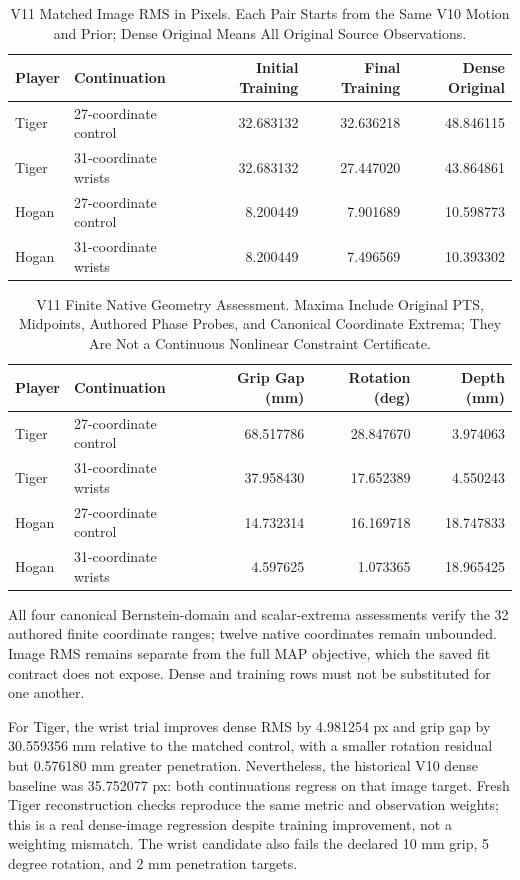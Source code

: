 \documentclass[11pt,letterpaper]{article}
\begin{document}
\begin{table}[ht]\centering\small
\begin{tabular}{@{}llrrr@{}}
\toprule Player & Continuation & Initial Training & Final Training & Dense Original\\\midrule
Tiger & 27-coordinate control & 32.683132 & 32.636218 & 48.846115\\
Tiger & 31-coordinate wrists & 32.683132 & 27.447020 & 43.864861\\
Hogan & 27-coordinate control & 8.200449 & 7.901689 & 10.598773\\
Hogan & 31-coordinate wrists & 8.200449 & 7.496569 & 10.393302\\
\bottomrule
\end{tabular}
\caption{V11 Matched Image RMS in Pixels. Each Pair Starts from the Same V10
Motion and Prior; Dense Original Means All Original Source Observations.}
\end{table}

\begin{table}[ht]\centering\small
\begin{tabular}{@{}llrrr@{}}
\toprule Player & Continuation & Grip Gap (mm) & Rotation (deg) & Depth (mm)\\\midrule
Tiger & 27-coordinate control & 68.517786 & 28.847670 & 3.974063\\
Tiger & 31-coordinate wrists & 37.958430 & 17.652389 & 4.550243\\
Hogan & 27-coordinate control & 14.732314 & 16.169718 & 18.747833\\
Hogan & 31-coordinate wrists & 4.597625 & 1.073365 & 18.965425\\
\bottomrule
\end{tabular}
\caption{V11 Finite Native Geometry Assessment. Maxima Include Original PTS,
Midpoints, Authored Phase Probes, and Canonical Coordinate Extrema; They Are
Not a Continuous Nonlinear Constraint Certificate.}
\end{table}
All four canonical Bernstein-domain and scalar-extrema assessments verify the
32 authored finite coordinate ranges; twelve native coordinates remain
unbounded. Image RMS remains separate from the full MAP objective, which the
saved fit contract does not expose. Dense and training rows must not be
substituted for one another.

For Tiger, the wrist trial improves dense RMS by 4.981254 px and grip gap by
30.559356 mm relative to the matched control, with a smaller rotation residual
but 0.576180 mm greater penetration. Nevertheless, the historical V10 dense
baseline was 35.752077 px: both continuations regress on that image target.
Fresh Tiger reconstruction checks reproduce the same metric and observation
weights; this is a real dense-image regression despite training improvement,
not a weighting mismatch. The wrist candidate also fails the declared
10 mm grip, 5 degree rotation, and 2 mm penetration targets.
\end{document}
